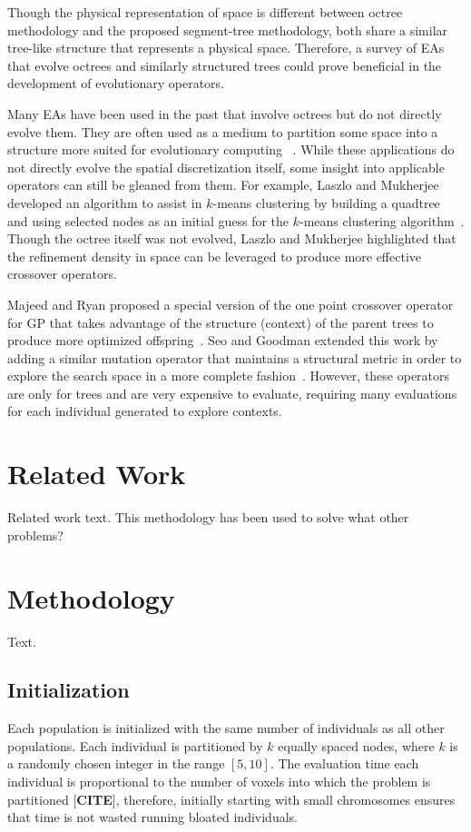 \documentclass[conference]{IEEEtran}
\begin{document}
Though the physical representation of space is different between octree methodology and the proposed segment-tree methodology, both share a similar tree-like structure that represents a physical space. Therefore, a survey of EAs that evolve octrees and similarly structured trees could prove beneficial in the development of evolutionary operators.

Many EAs have been used in the past that involve octrees but do not directly evolve them. They are often used as a medium to partition some space into a structure more suited for evolutionary computing ~\cite{ref:Zhu2015301, ref:Schwertfeger200853}. While these applications do not directly evolve the spatial discretization itself, some insight into applicable operators can still be gleaned from them. For example, Laszlo and Mukherjee developed an algorithm to assist in $k$-means clustering by building a quadtree and using selected nodes as an initial guess for the $k$-means clustering algorithm~\cite{ref:Laszlo2006}. Though the octree itself was not evolved, Laszlo and Mukherjee highlighted that the refinement density in space can be leveraged to produce more effective crossover operators.

Majeed and Ryan proposed a special version of the one point crossover operator for GP that takes advantage of the structure (context) of the parent trees to produce more optimized offspring~\cite{ref:Majeed2007}. Seo and Goodman extended this work by adding a similar mutation operator that maintains a structural metric in order to explore the search space in a more complete fashion~\cite{ref:seo2009}. However, these operators are only for trees and are very expensive to evaluate, requiring many evaluations for each individual generated to explore contexts.

\section{Related Work}
Related work text. This methodology has been used to solve what other problems?

\section{Methodology}
Text.

\subsection{Initialization}
Each population is initialized with the same number of individuals as all other populations. Each individual is partitioned by $k$ equally spaced nodes, where $k$ is a randomly chosen integer in the range $[5,10]$. The evaluation time each individual is proportional to the number of voxels into which the problem is partitioned [\textbf{CITE}], therefore, initially starting with small chromosomes ensures that time is not wasted running bloated individuals.
\end{document}
